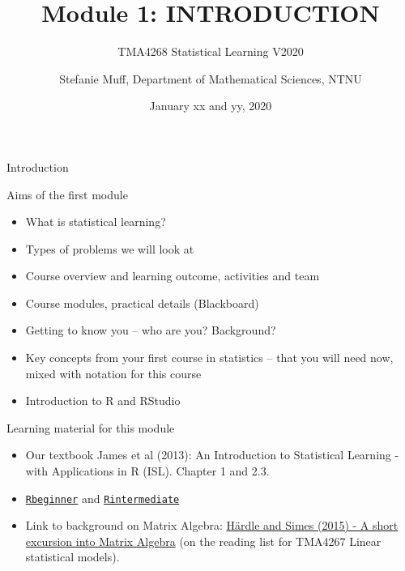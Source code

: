 \documentclass[ignorenonframetext,]{beamer}
\title{Module 1: INTRODUCTION}
\subtitle{TMA4268 Statistical Learning V2020}
\author{Stefanie Muff, Department of Mathematical Sciences, NTNU}
\date{January xx and yy, 2020}
\begin{document}
\frame{\titlepage}

\begin{frame}

\end{frame}

\begin{frame}{Introduction}

\begin{block}{Aims of the first module}

\begin{itemize}
\item
  What is statistical learning?
\item
  Types of problems we will look at
\item
  Course overview and learning outcome, activities and team
\item
  Course modules, practical details (Blackboard)
\item
  Getting to know you -- who are you? Background?
\item
  Key concepts from your first course in statistics -- that you will
  need now, mixed with notation for this course
\item
  Introduction to R and RStudio\\
\end{itemize}

\end{block}

\end{frame}

\begin{frame}

\begin{block}{Learning material for this module}

\begin{itemize}
\item
  Our textbook James et al (2013): An Introduction to Statistical
  Learning - with Applications in R (ISL). Chapter 1 and 2.3.
\item
  \href{https://www.math.ntnu.no/emner/TMA4268/2019v/1Intro/Rbeginner.html}{\texttt{Rbeginner}}
  and
  \href{https://www.math.ntnu.no/emner/TMA4268/2019v/1Intro/Rintermediate.html}{\texttt{Rintermediate}}
\item
  Link to background on Matrix Algebra:
  \href{https://link.springer.com/chapter/10.1007/978-3-662-45171-7_2}{Härdle
  and Simes (2015) - A short excursion into Matrix Algebra} (on the
  reading list for TMA4267 Linear statistical models).
\end{itemize}

\end{block}

\end{frame}
\end{document}
